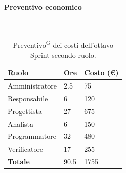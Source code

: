 \documentclass[8pt]{article}
\newcommand{\glossterm}[1]{#1\textsuperscript{G}} %
\newcommand{\subsubsubsection}[1]{\paragraph{#1}\mbox{}\\}
\begin{document}
\subsubsubsection{Preventivo economico}
    \begin{table}[ht!]
	\centering
	\begin{tabular}{p{4cm} p{1cm} p{2cm}}
        \toprule
        \textbf{Ruolo} & \textbf{Ore} & \textbf{Costo (€)} \\
        \midrule
        Amministratore & 2.5  & 75   \\
        Responsabile   & 6  & 120 \\
        Progettista    & 27 & 675 \\
        Analista       & 6 & 150 \\
        Programmatore  & 32 & 480 \\
        Verificatore   & 17 & 255 \\
        \midrule
        \textbf{Totale} & 90.5 & 1755
    \end{tabular}
    \caption{\glossterm{Preventivo} dei costi dell'ottavo Sprint secondo ruolo.}
	\label{table:Preventivo dei costi dell'ottavo Sprint secondo ruolo}
\end{table}
\end{document}
